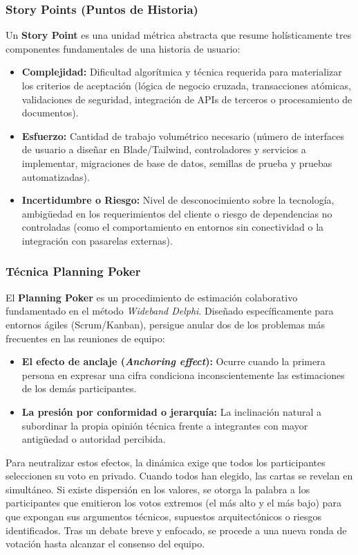\subsubsection{Story Points (Puntos de Historia)}
Un \textbf{Story Point} es una unidad métrica abstracta que resume holísticamente tres componentes fundamentales de una historia de usuario:
\begin{itemize}
    \item \textbf{Complejidad:} Dificultad algorítmica y técnica requerida para materializar los criterios de aceptación (lógica de negocio cruzada, transacciones atómicas, validaciones de seguridad, integración de APIs de terceros o procesamiento de documentos).
    \item \textbf{Esfuerzo:} Cantidad de trabajo volumétrico necesario (número de interfaces de usuario a diseñar en Blade/Tailwind, controladores y servicios a implementar, migraciones de base de datos, semillas de prueba y pruebas automatizadas).
    \item \textbf{Incertidumbre o Riesgo:} Nivel de desconocimiento sobre la tecnología, ambigüedad en los requerimientos del cliente o riesgo de dependencias no controladas (como el comportamiento en entornos sin conectividad o la integración con pasarelas externas).
\end{itemize}

\subsubsection{Técnica Planning Poker}
El \textbf{Planning Poker} es un procedimiento de estimación colaborativo fundamentado en el método \textit{Wideband Delphi}. Diseñado específicamente para entornos ágiles (Scrum/Kanban), persigue anular dos de los problemas más frecuentes en las reuniones de equipo:
\begin{itemize}
    \item \textbf{El efecto de anclaje (\textit{Anchoring effect}):} Ocurre cuando la primera persona en expresar una cifra condiciona inconscientemente las estimaciones de los demás participantes.
    \item \textbf{La presión por conformidad o jerarquía:} La inclinación natural a subordinar la propia opinión técnica frente a integrantes con mayor antigüedad o autoridad percibida.
\end{itemize}

Para neutralizar estos efectos, la dinámica exige que todos los participantes seleccionen su voto en privado. Cuando todos han elegido, las cartas se revelan en simultáneo. Si existe dispersión en los valores, se otorga la palabra a los participantes que emitieron los votos extremos (el más alto y el más bajo) para que expongan sus argumentos técnicos, supuestos arquitectónicos o riesgos identificados. Tras un debate breve y enfocado, se procede a una nueva ronda de votación hasta alcanzar el consenso del equipo.

